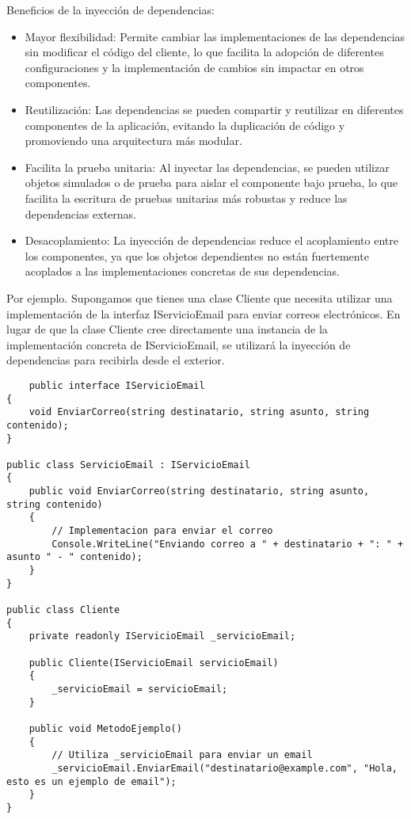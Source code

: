 \documentclass[executivepaper]{article}
\begin{document}
Beneficios de la inyección de dependencias:

\begin{itemize}
    \item Mayor flexibilidad: Permite cambiar las implementaciones de las dependencias sin modificar el código del cliente, lo que facilita la adopción de diferentes configuraciones y la implementación de cambios sin impactar en otros componentes.
    \item Reutilización: Las dependencias se pueden compartir y reutilizar en diferentes componentes de la aplicación, evitando la duplicación de código y promoviendo una arquitectura más modular.
    \item Facilita la prueba unitaria: Al inyectar las dependencias, se pueden utilizar objetos simulados o de prueba para aislar el componente bajo prueba, lo que facilita la escritura de pruebas unitarias más robustas y reduce las dependencias externas.
    \item Desacoplamiento: La inyección de dependencias reduce el acoplamiento entre los componentes, ya que los objetos dependientes no están fuertemente acoplados a las implementaciones concretas de sus dependencias.
\end{itemize}

Por ejemplo. Supongamos que tienes una clase Cliente que necesita utilizar una implementación de la interfaz IServicioEmail para enviar correos electrónicos. En lugar de que la clase Cliente cree directamente una instancia de la implementación concreta de IServicioEmail, se utilizará la inyección de dependencias para recibirla desde el exterior.

\begin{lstlisting}
    public interface IServicioEmail
{
    void EnviarCorreo(string destinatario, string asunto, string contenido);
}

public class ServicioEmail : IServicioEmail
{
    public void EnviarCorreo(string destinatario, string asunto, string contenido)
    {
        // Implementacion para enviar el correo
        Console.WriteLine("Enviando correo a " + destinatario + ": " + asunto " - " contenido);
    }
}

public class Cliente
{
    private readonly IServicioEmail _servicioEmail;

    public Cliente(IServicioEmail servicioEmail)
    {
        _servicioEmail = servicioEmail;
    }

    public void MetodoEjemplo()
    {
        // Utiliza _servicioEmail para enviar un email
        _servicioEmail.EnviarEmail("destinatario@example.com", "Hola, esto es un ejemplo de email");
    }
}

\end{lstlisting}
\end{document}
